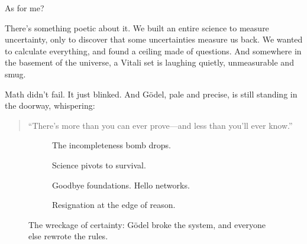 As for me?

There’s something poetic about it. We built an entire science to measure uncertainty, only to discover that some uncertainties measure us back. We wanted to calculate everything, and found a ceiling made of questions. And somewhere in the basement of the universe, a Vitali set is laughing quietly, unmeasurable and smug.

Math didn’t fail. It just blinked. And Gödel, pale and precise, is still standing in the doorway, whispering:

\begin{quote}
“There’s more than you can ever prove—and less than you’ll ever know.”
\end{quote}



\begin{figure}[H]
\centering

\begin{subfigure}[t]{0.45\textwidth}
\centering
{}
\caption*{The incompleteness bomb drops.}
\end{subfigure}
\hfill
\begin{subfigure}[t]{0.45\textwidth}
\centering
{}
\caption*{Science pivots to survival.}
\end{subfigure}

\vspace{1em}

\begin{subfigure}[t]{0.45\textwidth}
\centering
{}
\caption*{Goodbye foundations. Hello networks.}
\end{subfigure}
\hfill
\begin{subfigure}[t]{0.45\textwidth}
\centering
{}
\caption*{Resignation at the edge of reason.}
\end{subfigure}

\caption{The wreckage of certainty: Gödel broke the system, and everyone else rewrote the rules.}
\end{figure}







